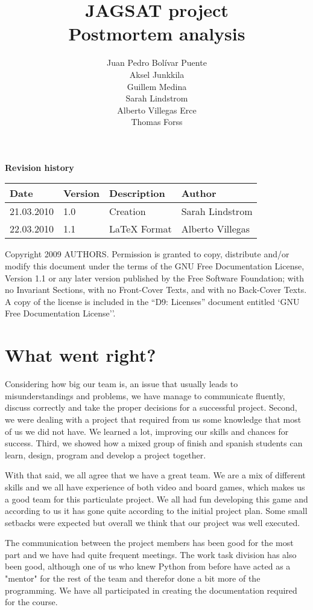 \documentclass[12pt,a4paper]{article}
\title{\large JAGSAT project\\\huge Postmortem analysis}
\author{
  Juan Pedro Bolívar Puente\\ 
  Aksel Junkkila\\
  Guillem Medina\\ 
  Sarah Lindstrom\\ 
  Alberto Villegas Erce\\ 
  Thomas Forss
}
\begin{document}
\maketitle

\begin{center}
\textbf {Revision history}

\begin{tabular}{ l | l | l | l }
Date			&Version	&Description		&Author\\\hline\hline
21.03.2010	&1.0		&Creation 		&Sarah Lindstrom\\
22.03.2010	&1.1		&LaTeX Format	&Alberto Villegas
\end{tabular}
\label{tab:rev}
\end{center}

\vfill
Copyright 2009 AUTHORS.
Permission is granted to copy, distribute and/or modify this document under the terms of the GNU Free Documentation License, Version 1.1 or any later version published by the Free Software Foundation;  with no Invariant Sections, with no Front-Cover Texts, and with no Back-Cover Texts. A copy of the license is included in the ``D9: Licenses''  document entitled `GNU Free Documentation License''.

\pagebreak
\tableofcontents
\pagebreak

\section{What went right?}
Considering how big our team is, an issue that usually leads to misunderstandings and problems, we have manage to communicate fluently, discuss correctly and take the proper decisions for a successful project. Second, we were dealing with a project that required from us some knowledge that most of us we did not have. We learned a lot, improving our skills and chances for success.  Third, we showed how a mixed group of finish and spanish students can learn, design, program and develop a project together.

With that said, we all agree that we have a great team. We are a mix of different skills and we all have experience of both video and board games, which makes us a good team for this particulate project. We all had fun developing this game and according to us it has gone quite according to the initial project plan. Some small setbacks were expected but overall we think that our project was well executed.

The communication between the project members has been good for the most part and we have had quite frequent meetings. The work task division has also been good, although one of us who knew Python from before have acted as a "mentor" for the rest of the team and therefor done a bit more of the programming. We have all participated in creating the documentation required for the course. 
\end{document}
